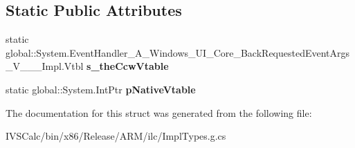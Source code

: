 \subsection*{Static Public Attributes}
\begin{DoxyCompactItemize}
\item 
\mbox{\label{struct_system_1_1_event_handler___a___windows___u_i___core___back_requested_event_args___v_______impl_1_1_vtbl_a772bed2791d6b8997062aa61e9d053d4}} 
static global\+::\+System.\+Event\+Handler\+\_\+\+A\+\_\+\+Windows\+\_\+\+U\+I\+\_\+\+Core\+\_\+\+Back\+Requested\+Event\+Args\+\_\+\+V\+\_\+\+\_\+\+\_\+\+Impl.\+Vtbl {\bfseries s\+\_\+the\+Ccw\+Vtable}
\item 
\mbox{\label{struct_system_1_1_event_handler___a___windows___u_i___core___back_requested_event_args___v_______impl_1_1_vtbl_a69f9fe1c7d3a9d71d5c989fd8ce36236}} 
static global\+::\+System.\+Int\+Ptr {\bfseries p\+Native\+Vtable}
\end{DoxyCompactItemize}


The documentation for this struct was generated from the following file\+:\begin{DoxyCompactItemize}
\item 
I\+V\+S\+Calc/bin/x86/\+Release/\+A\+R\+M/ilc/Impl\+Types.\+g.\+cs\end{DoxyCompactItemize}
